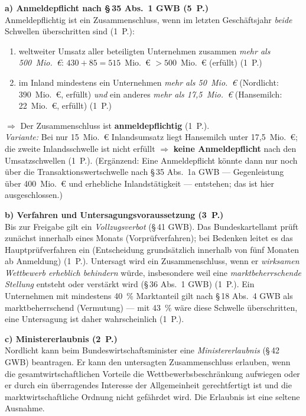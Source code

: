 \begin{loesung}[title={Lösung Aufgabe~2.3 --- Fusionskontrolle und Missbrauchsaufsicht}]
\textbf{a) Anmeldepflicht nach \S\,35 Abs.~1 GWB (5~P.)}\\
Anmeldepflichtig ist ein Zusammenschluss, wenn im letzten Geschäftsjahr \emph{beide}
Schwellen überschritten sind (1~P.):
\begin{enumerate}[label=(\arabic*)]
  \item weltweiter Umsatz aller beteiligten Unternehmen zusammen \emph{mehr als
    500~Mio.~€}: $430 + 85 = 515$~Mio.~€ $> 500$~Mio.~€ (erfüllt) (1~P.)
  \item im Inland mindestens ein Unternehmen \emph{mehr als 50~Mio.~€} (Nordlicht:
    390~Mio.~€, erfüllt) \emph{und} ein anderes \emph{mehr als 17,5~Mio.~€}
    (Hansemilch: 22~Mio.~€, erfüllt) (1~P.)
\end{enumerate}
$\Rightarrow$ Der Zusammenschluss ist \textbf{anmeldepflichtig} (1~P.).\\
\emph{Variante:} Bei nur 15~Mio.~€ Inlandsumsatz liegt Hansemilch unter 17,5~Mio.~€;
die zweite Inlandsschwelle ist nicht erfüllt $\Rightarrow$ \textbf{keine Anmeldepflicht}
nach den Umsatzschwellen (1~P.). (Ergänzend: Eine Anmeldepflicht könnte dann nur noch
über die Transaktionswertschwelle nach \S\,35 Abs.~1a GWB --- Gegenleistung über
400~Mio.~€ und erhebliche Inlandstätigkeit --- entstehen; das ist hier ausgeschlossen.)

\textbf{b) Verfahren und Untersagungsvoraussetzung (3~P.)}\\
Bis zur Freigabe gilt ein \emph{Vollzugsverbot} (\S\,41 GWB). Das Bundeskartellamt prüft
zunächst innerhalb eines Monats (Vorprüfverfahren); bei Bedenken leitet es das
Hauptprüfverfahren ein (Entscheidung grundsätzlich innerhalb von fünf Monaten ab
Anmeldung) (1~P.). Untersagt wird ein Zusammenschluss, wenn er \emph{wirksamen Wettbewerb
erheblich behindern} würde, insbesondere weil eine \emph{marktbeherrschende Stellung}
entsteht oder verstärkt wird (\S\,36 Abs.~1 GWB) (1~P.). Ein Unternehmen mit mindestens
40~\% Marktanteil gilt nach \S\,18 Abs.~4 GWB als marktbeherrschend (Vermutung) ---
mit 43~\% wäre diese Schwelle überschritten, eine Untersagung ist daher wahrscheinlich
(1~P.).

\textbf{c) Ministererlaubnis (2~P.)}\\
Nordlicht kann beim Bundeswirtschaftsminister eine \emph{Ministererlaubnis} (\S\,42 GWB)
beantragen. Er kann den untersagten Zusammenschluss erlauben, wenn die
gesamtwirtschaftlichen Vorteile die Wettbewerbsbeschränkung aufwiegen oder er durch ein
überragendes Interesse der Allgemeinheit gerechtfertigt ist und die marktwirtschaftliche
Ordnung nicht gefährdet wird. Die Erlaubnis ist eine seltene Ausnahme.


\end{loesung}
